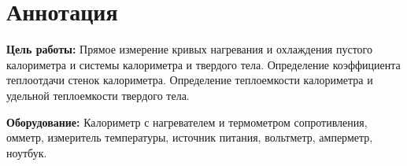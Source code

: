 \section{Аннотация}
\textbf{Цель работы:} Прямое измерение кривых нагревания и охлаждения пустого калориметра
и системы калориметра и твердого тела. Определение коэффициента теплоотдачи стенок калориметра.
Определение теплоемкости калориметра и удельной теплоемкости твердого тела.

\textbf{Оборудование:} Калориметр с нагревателем и термометром сопротивления,
омметр, измеритель температуры, источник питания, вольтметр, амперметр, ноутбук.